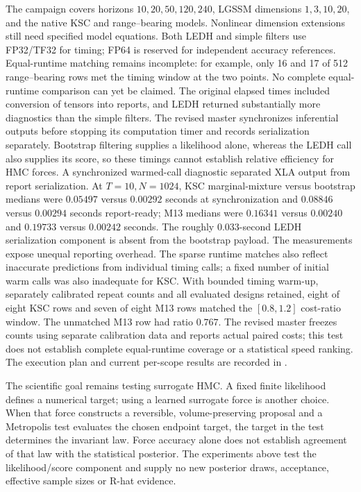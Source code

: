 The campaign covers horizons $10,20,50,120,240$, LGSSM dimensions
$1,3,10,20$, and the native KSC and range--bearing models. Nonlinear
dimension extensions still need specified model equations. Both LEDH and
simple filters use FP32/TF32 for timing; FP64 is reserved for independent
accuracy references. Equal-runtime matching remains incomplete: for example,
only 16 and 17 of 512 range--bearing rows met the timing window at the two
points. No complete equal-runtime comparison can yet be claimed. The original
elapsed times included conversion of tensors into reports, and LEDH
returned substantially more diagnostics than the simple filters. The revised
master synchronizes inferential outputs before stopping its computation
timer and records serialization separately. Bootstrap
filtering supplies a likelihood alone, whereas the LEDH call also supplies
its score, so these timings cannot establish relative efficiency for HMC
forces.
A synchronized warmed-call diagnostic separated XLA output from report
serialization. At $T=10,N=1024$, KSC marginal-mixture versus bootstrap
medians were $0.05497$ versus $0.00292$ seconds at synchronization and
$0.08846$ versus $0.00294$ seconds report-ready; M13 medians were $0.16341$
versus $0.00240$ and $0.19733$ versus $0.00242$ seconds. The roughly
$0.033$-second LEDH serialization component is absent from the bootstrap
payload. The measurements expose unequal reporting overhead. The sparse runtime
matches also reflect inaccurate predictions from individual timing calls;
a fixed number of initial warm calls was also inadequate for KSC. With
bounded timing warm-up, separately calibrated repeat counts and all evaluated
designs retained, eight of eight KSC rows and seven of eight M13 rows matched
the $[0.8,1.2]$ cost-ratio window. The unmatched M13 row had ratio $0.767$.
The revised master freezes counts using separate calibration data and reports
actual paired costs; this test does not establish complete equal-runtime
coverage or a statistical speed ranking. The execution plan and current per-scope results are recorded in
\begingroup\def\UrlBreaks{\do\/\do-\do.}\endgroup.

The scientific goal remains testing surrogate HMC. A fixed finite likelihood
defines a numerical target; using a learned surrogate force is another choice.
When that force constructs a reversible, volume-preserving proposal and a
Metropolis test evaluates the chosen endpoint target, the target in the test
determines the invariant law. Force accuracy alone does not establish agreement
of that law with the statistical posterior. The experiments above test the
likelihood/score component and supply no new posterior draws, acceptance,
effective sample sizes or R-hat evidence.



